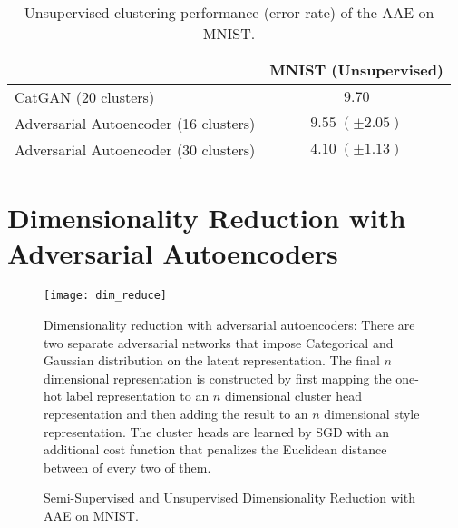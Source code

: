 \documentclass{article}
\begin{document}
\begin{center}
\begin{table}[t]
\small
\centering \begin{tabular}{ l  || c}
  \hline
  & MNIST (Unsupervised)\\
  \hline

  CatGAN \citep{catgan}(20 clusters) & $9.70$  \\  
  Adversarial Autoencoder (16 clusters) & $9.55\;(\pm 2.05)$ \\
  Adversarial Autoencoder (30 clusters) & $4.10\;(\pm 1.13)$ \\
  \hline
\end{tabular}
\caption{\label{table:cluster}Unsupervised clustering performance (error-rate) of the AAE on MNIST.}
\end{table}
\end{center}


\section{Dimensionality Reduction with Adversarial Autoencoders}\label{dim_reduce}

\begin{figure}[!b]
\begin{center}
\centering 
\texttt{[image: dim\_reduce]}
\caption{\label{fig_2d}Dimensionality reduction with adversarial autoencoders: There are two separate adversarial networks that impose Categorical and Gaussian distribution on the latent representation. The final $n$ dimensional representation is constructed by first mapping the one-hot label representation to an $n$ dimensional cluster head representation and then adding the result to an $n$ dimensional style representation. The cluster heads are learned by SGD with an additional cost function that penalizes the Euclidean distance between of every two of them.}
\end{center}
\end{figure}

\begin{figure}[t]
\centering

\caption{\label{fig:dim}Semi-Supervised and Unsupervised Dimensionality Reduction with AAE on MNIST.}
\end{figure}
\end{document}
